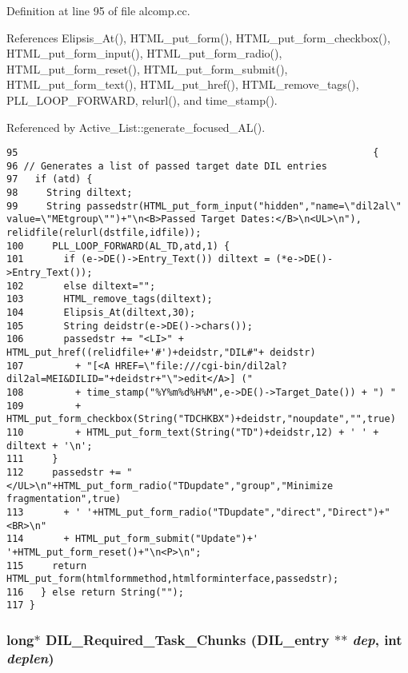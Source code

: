 Definition at line 95 of file alcomp.cc.

References Elipsis\_\-At(), HTML\_\-put\_\-form(), HTML\_\-put\_\-form\_\-checkbox(), HTML\_\-put\_\-form\_\-input(), HTML\_\-put\_\-form\_\-radio(), HTML\_\-put\_\-form\_\-reset(), HTML\_\-put\_\-form\_\-submit(), HTML\_\-put\_\-form\_\-text(), HTML\_\-put\_\-href(), HTML\_\-remove\_\-tags(), PLL\_\-LOOP\_\-FORWARD, relurl(), and time\_\-stamp().

Referenced by Active\_\-List::generate\_\-focused\_\-AL().



\footnotesize\begin{verbatim}95                                                              {
96 // Generates a list of passed target date DIL entries
97   if (atd) {
98     String diltext;
99     String passedstr(HTML_put_form_input("hidden","name=\"dil2al\" value=\"MEtgroup\"")+"\n<B>Passed Target Dates:</B>\n<UL>\n"), relidfile(relurl(dstfile,idfile));
100     PLL_LOOP_FORWARD(AL_TD,atd,1) {
101       if (e->DE()->Entry_Text()) diltext = (*e->DE()->Entry_Text());
102       else diltext="";
103       HTML_remove_tags(diltext);
104       Elipsis_At(diltext,30);
105       String deidstr(e->DE()->chars());
106       passedstr += "<LI>" + HTML_put_href((relidfile+'#')+deidstr,"DIL#"+ deidstr)
107         + "[<A HREF=\"file:///cgi-bin/dil2al?dil2al=MEI&DILID="+deidstr+"\">edit</A>] ("
108         + time_stamp("%Y%m%d%H%M",e->DE()->Target_Date()) + ") "
109         + HTML_put_form_checkbox(String("TDCHKBX")+deidstr,"noupdate","",true)
110         + HTML_put_form_text(String("TD")+deidstr,12) + ' ' + diltext + '\n';
111     }
112     passedstr += "</UL>\n"+HTML_put_form_radio("TDupdate","group","Minimize fragmentation",true)
113       + ' '+HTML_put_form_radio("TDupdate","direct","Direct")+"<BR>\n"
114       + HTML_put_form_submit("Update")+' '+HTML_put_form_reset()+"\n<P>\n";
115     return HTML_put_form(htmlformmethod,htmlforminterface,passedstr);
116   } else return String("");
117 }
\end{verbatim}\normalsize 
{}
\subsubsection{\setlength{\rightskip}{0pt plus 5cm}long$\ast$ DIL\_\-Required\_\-Task\_\-Chunks ({\bf DIL\_\-entry} $\ast$$\ast$ {\em dep}, int {\em deplen})}\label{alcomp_8cc_a10}




